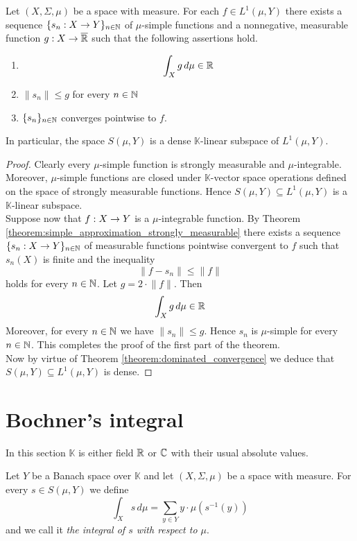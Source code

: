 \begin{theorem}\label{theorem:simple_are_dense}
Let $(X,\Sigma, \mu)$ be a space with measure. For each $f \in L^1(\mu,Y)$ there exists a sequence $\{s_n:X\rightarrow Y\}_{n\in {\mathbb N}}$ of $\mu$-simple functions and a nonnegative, measurable function $g:X\rightarrow \overline{{\mathbb R}}$ such that the following assertions hold.
\begin{enumerate}[label=\emph{\textbf{(\arabic*)}}, leftmargin=*]
\item
$$\int_Xg\,d\mu \in {\mathbb R}$$
\item $\lVert s_n \rVert \leq g$ for every $n\in {\mathbb N}$
\item $\{s_n\}_{n\in {\mathbb N}}$ converges pointwise to $f$.
\end{enumerate}
In particular, the space $S(\mu, Y)$ is a dense $\mathbb{K}$-linear subspace of $L^1(\mu, Y)$.
\end{theorem}
\begin{proof}
Clearly every $\mu$-simple function is strongly measurable and $\mu$-integrable. Moreover, $\mu$-simple functions are closed under $\mathbb{K}$-vector space operations defined on the space of strongly measurable functions. Hence $S(\mu, Y) \subseteq L^1(\mu, Y)$ is a $\mathbb{K}$-linear subspace.\\
Suppose now that $f:X\rightarrow Y$ is a $\mu$-integrable function. By Theorem \ref{theorem:simple_approximation_strongly_measurable} there exists a sequence $\{s_n:X\rightarrow Y\}_{n\in {\mathbb N}}$ of measurable functions pointwise convergent to $f$ such that $s_n(X)$ is finite and the inequality
$$\lVert f - s_n\rVert\leq \lVert f\rVert$$
holds for every $n\in {\mathbb N}$. Let $g = 2\cdot \lVert f\rVert$. Then 
$$\int_Xg\,d\mu \in {\mathbb R}$$
Moreover, for every $n\in {\mathbb N}$ we have $\lVert s_n \rVert\leq g$. Hence $s_n$ is $\mu$-simple for every $n\in {\mathbb N}$. This completes the proof of the first part of the  theorem.\\
Now by virtue of Theorem \ref{theorem:dominated_convergence} we deduce that $S(\mu, Y)\subseteq L^1(\mu, Y)$ is dense.
\end{proof}

\section{Bochner's integral}\label{section:bochner_integration}
\noindent
In this section $\mathbb{K}$ is either field ${\mathbb R}$ or ${\mathbb C}$ with their usual absolute values.

\begin{definition}
Let $Y$ be a Banach space over $\mathbb{K}$ and let $(X,\Sigma,\mu)$ be a space with measure. For every $s \in S(\mu, Y)$ we define
$$\int_X s\,d\mu = \sum_{y\in Y}y\cdot \mu\left(s^{-1}(y)\right)$$
and we call it \textit{the integral of $s$ with respect to $\mu$}.
\end{definition}


